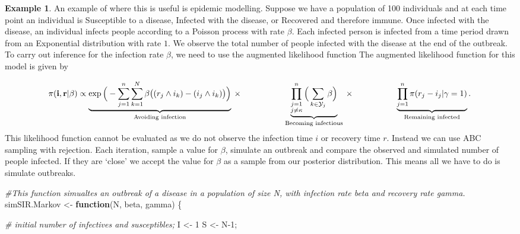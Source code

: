 \documentclass[
]{book}
\newenvironment{Shaded}{\begin{snugshade}}{\end{snugshade}}
\newcommand{\CommentTok}[1]{\textcolor[rgb]{0.56,0.35,0.01}{\textit{#1}}}
\newcommand{\ControlFlowTok}[1]{\textcolor[rgb]{0.13,0.29,0.53}{\textbf{#1}}}
\newcommand{\DecValTok}[1]{\textcolor[rgb]{0.00,0.00,0.81}{#1}}
\newcommand{\NormalTok}[1]{#1}
\newcommand{\OtherTok}[1]{\textcolor[rgb]{0.56,0.35,0.01}{#1}}
\theoremstyle{definition}
\theoremstyle{definition}
\newtheorem{example}{Example}[chapter]
\theoremstyle{definition}
\theoremstyle{definition}
\theoremstyle{remark}
\begin{document}
\begin{example}

An example of where this is useful is epidemic modelling. Suppose we have a population of 100 individuals and at each time point an individual is Susceptible to a disease, Infected with the disease, or Recovered and therefore immune. Once infected with the disease, an individual infects people according to a Poisson process with rate \(\beta\). Each infected person is infected from a time period drawn from an Exponential distribution with rate \(1\). We observe the total number of people infected with the disease at the end of the outbreak. To carry out inference for the infection rate \(\beta\), we need to use the augmented likelihood function The augmented likelihood function for this model is given by

\[
\pi(\textbf{i}, \textbf{r}| \beta) \propto \underbrace{\exp\Big(- \sum\limits_{j=1}^n\sum\limits_{k=1}^N \beta\big((r_j \wedge i_k) - (i_j \wedge i_k)\big)\Big)}_\text{Avoiding infection} \\
 \times\hspace{1.8cm} \underbrace{\prod\limits_{\substack{j=1 \\ j \neq \kappa}}^n\Big(\sum\limits_{k \in \mathcal{Y}_j} \beta\Big)}_\text{Becoming infectious}  \\
\times \hspace{1.8cm}\underbrace{\prod\limits_{j=1}^n\pi(r_j -i_j | \gamma = 1)}_\text{Remaining infected}.
\]
This likelihood function cannot be evaluated as we do not observe the infection time \(i\) or recovery time \(r\). Instead we can use ABC sampling with rejection. Each iteration, sample a value for \(\beta\), simulate an outbreak and compare the observed and simulated number of people infected. If they are `close' we accept the value for \(\beta\) as a sample from our posterior distribution. This means all we have to do is simulate outbreaks.

\begin{Shaded}
\begin{Highlighting}[]
\CommentTok{\#This function simualtes an outbreak of a disease in a population of size N, with infection rate beta and recovery rate gamma.}
\NormalTok{simSIR.Markov }\OtherTok{\textless{}{-}} \ControlFlowTok{function}\NormalTok{(N, beta, gamma) \{}
  
  \CommentTok{\# initial number of infectives and susceptibles;}
\NormalTok{  I }\OtherTok{\textless{}{-}} \DecValTok{1}
\NormalTok{  S }\OtherTok{\textless{}{-}}\NormalTok{ N}\DecValTok{{-}1}\NormalTok{;}
  

\end{Highlighting}
\end{Shaded}
\end{example}
\end{document}
